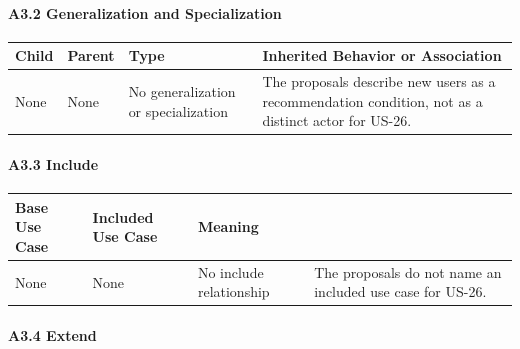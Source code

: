 \documentclass[12pt]{article}
\renewcommand{\baselinestretch}{1.5}
\begin{document}
\hypertarget{sec:a3-2-generalization-and-specialization}{}
\paragraph*{A3.2 Generalization and Specialization}
\par\medskip

\begingroup
\small
\renewcommand{\baselinestretch}{1.0}\selectfont
\renewcommand{\arraystretch}{1.15}
\setlength{\tabcolsep}{6pt}
\begin{longtable}{|>{\raggedright\arraybackslash}p{}|>{\raggedright\arraybackslash}p{}|>{\raggedright\arraybackslash}p{}|>{\raggedright\arraybackslash}p{}|}
\hline
\textbf{Child} & \textbf{Parent} & \textbf{Type} & \textbf{Inherited Behavior or Association} \\ \hline
\endhead
None & None & No generalization or specialization & The proposals describe new users as a recommendation condition, not as a distinct actor for US-26. \\ \hline
\end{longtable}
\endgroup
\par\medskip

\hypertarget{sec:a3-3-include}{}
\paragraph*{A3.3 Include}
\par\medskip

\begingroup
\small
\renewcommand{\baselinestretch}{1.0}\selectfont
\renewcommand{\arraystretch}{1.15}
\setlength{\tabcolsep}{6pt}
\begin{longtable}{|>{\raggedright\arraybackslash}p{}|>{\raggedright\arraybackslash}p{}|>{\raggedright\arraybackslash}p{}|}
\hline
\textbf{Base Use Case} & \textbf{Included Use Case} & \textbf{Meaning} \\ \hline
\endhead
None & None & No include relationship & The proposals do not name an included use case for US-26. \\ \hline
\end{longtable}
\endgroup
\par\medskip

\hypertarget{sec:a3-4-extend}{}
\paragraph*{A3.4 Extend}
\par\medskip
\end{document}
